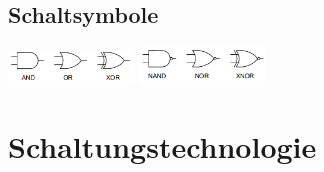 \documentclass[10pt]{article}
\begin{document}
\subsection{Schaltsymbole}
\begin{multicols}{2}
\includegraphics[width=0.25\textwidth]{Zeichen.PNG}
\columnbreak
\includegraphics[width=0.25\textwidth]{Zeichen2.PNG}
\end{multicols}
\section{Schaltungstechnologie}
\end{document}
